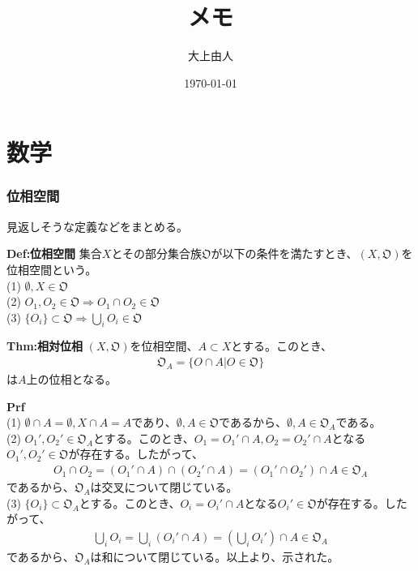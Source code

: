 \documentclass[a4paper,11pt]{jsarticle}
\numberwithin{equation}{section}
\begin{document}
\title{メモ}
\author{大上由人}
\date{\today}
\maketitle

\tableofcontents
\newpage

\part{数学}
\section{位相空間}
見返しそうな定義などをまとめる。\\
\begin{itembox}[l]{\textbf{Def:位相空間}}
  集合$X$とその部分集合族$\mathfrak{O}$が以下の条件を満たすとき、$(X,\mathfrak{O})$を位相空間という。\\
  (1) $\emptyset, X \in \mathfrak{O}$\\
  (2) $O_1,O_2 \in \mathfrak{O} \Rightarrow O_1 \cap O_2 \in \mathfrak{O}$\\
  (3) $\{O_i\} \subset \mathfrak{O} \Rightarrow \bigcup_{i} O_i \in \mathfrak{O}$\\
\end{itembox}

\begin{itembox}[l]{\textbf{Thm:相対位相}}
  $(X,\mathfrak{O})$を位相空間、$A \subset X$とする。このとき、
  \begin{align}
    \mathfrak{O}_A = \{O \cap A | O \in \mathfrak{O}\}
  \end{align}
  は$A$上の位相となる。
\end{itembox}
\textbf{Prf}\\
(1) $\emptyset \cap A = \emptyset, X \cap A = A$であり、$\emptyset, A \in \mathfrak{O}$であるから、$\emptyset, A \in \mathfrak{O}_A$である。\\
(2) $O_1',O_2' \in \mathfrak{O}_A$とする。このとき、$O_1 = O_1' \cap A, O_2 = O_2' \cap A$となる$O_1',O_2' \in \mathfrak{O}$が存在する。したがって、
\begin{align}
  O_1 \cap O_2 = (O_1' \cap A) \cap (O_2' \cap A) = (O_1' \cap O_2') \cap A \in \mathfrak{O}_A
\end{align}
であるから、$\mathfrak{O}_A$は交叉について閉じている。\\
(3) $\{O_i\} \subset \mathfrak{O}_A$とする。このとき、$O_i = O_i' \cap A$となる$O_i' \in \mathfrak{O}$が存在する。したがって、
\begin{align}
  \bigcup_{i} O_i = \bigcup_{i} (O_i' \cap A) = \left(\bigcup_{i} O_i'\right) \cap A \in \mathfrak{O}_A
\end{align}
であるから、$\mathfrak{O}_A$は和について閉じている。以上より、示された。\hfill\qedsymbol\\
\end{document}
